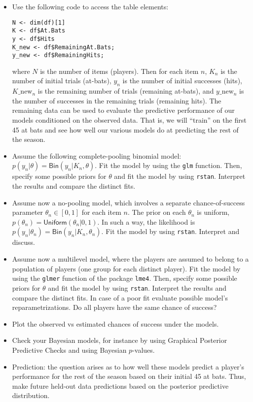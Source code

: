\begin{itemize}
\item Use the following code to access the table elements:

\begin{verbatim}
N <- dim(df)[1]
K <- df$At.Bats
y <- df$Hits
K_new <- df$RemainingAt.Bats;
y_new <- df$RemainingHits;
\end{verbatim}
where $N$ is the number of items (players). Then for each item $n$, $K_{n}$ is the number of initial trials (at-bats), $y_n$ is the number of initial successes (hits), $K\_\text{new}_{n}$ is the remaining number of trials (remaining at-bats), and $y\_\text{new}_{n}$ is the number of successes in the remaining trials (remaining hits). The remaining data can be used to evaluate the predictive performance of our models conditioned on the observed data. That is, we will “train” on the first 45 at bats and see how well our various models do at predicting the rest of the season.
\item Assume the following complete-pooling binomial model: $p(y_n| \theta)= \mathsf{Bin}(y_n|K_n, \theta)$. Fit the model by using the \texttt{glm} function. Then, specify some possible priors for $\theta$ and fit the model by using \texttt{rstan}. Interpret the results and compare the distinct fits.
\item Assume now a no-pooling model, which  involves a separate chance-of-success parameter $\theta_n \in [0,1]$ for each item $n$. The prior on each $\theta_n$ is uniform, $p(\theta_n)= \mathsf{Uniform}(\theta_n| 0,1)$.  In such a way, the likelihood is $p(y_n|\theta_n) = \mathsf{Bin}(y_n|K_n, \theta_n)$. Fit the model by using \texttt{rstan}. Interpret and discuss.
\item Assume now a multilevel model, where the players are assumed to belong to a population of players (one group for each distinct player). Fit the model by using the \texttt{glmer} function of the package \texttt{lme4}. Then, specify some possible priors for $\theta$ and fit the model by using \texttt{rstan}. Interpret the results and compare the distinct fits. In case of a poor fit evaluate possible model's reparametrizations. Do all players have the same chance of success?
\item Plot the observed vs estimated chances of success under the models.
\item Check your Bayesian models, for instance by using Graphical Posterior Predictive Checks and using Bayesian $p$-values.
\item Prediction: the question arises as to how well these models predict a player’s performance for the rest of the season based on their initial 45 at bats. Thus, make future held-out data predictions based on the posterior predictive distribution.

\end{itemize}
